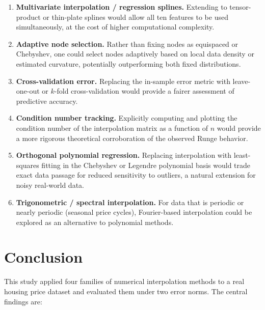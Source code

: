 \documentclass[11pt]{article}
\begin{document}
\begin{enumerate}
  \item \textbf{Multivariate interpolation / regression splines.}  Extending
        to tensor-product or thin-plate splines would allow all ten features
        to be used simultaneously, at the cost of higher computational
        complexity.

  \item \textbf{Adaptive node selection.}  Rather than fixing nodes as
        equispaced or Chebyshev, one could select nodes adaptively based on
        local data density or estimated curvature, potentially outperforming
        both fixed distributions.

  \item \textbf{Cross-validation error.}  Replacing the in-sample error
        metric with leave-one-out or $k$-fold cross-validation would provide
        a fairer assessment of predictive accuracy.

  \item \textbf{Condition number tracking.}  Explicitly computing and plotting
        the condition number of the interpolation matrix as a function of $n$
        would provide a more rigorous theoretical corroboration of the observed
        Runge behavior.

  \item \textbf{Orthogonal polynomial regression.}  Replacing interpolation
        with least-squares fitting in the Chebyshev or Legendre polynomial
        basis would trade exact data passage for reduced sensitivity to
        outliers, a natural extension for noisy real-world data.

  \item \textbf{Trigonometric / spectral interpolation.}  For data that is
        periodic or nearly periodic (seasonal price cycles), Fourier-based
        interpolation could be explored as an alternative to polynomial methods.
\end{enumerate}

\section{Conclusion}

This study applied four families of numerical interpolation methods to a
real housing price dataset and evaluated them under two error norms.  The
central findings are:
\end{document}
